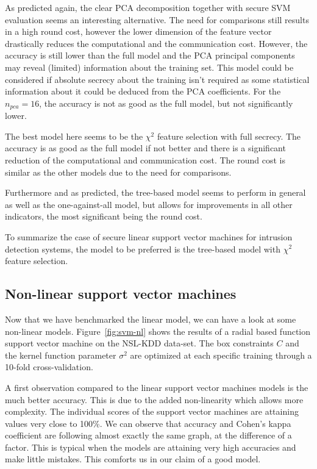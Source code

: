 As predicted again, the clear PCA decomposition together with secure SVM evaluation seems an interesting alternative. The need for comparisons still results in a high round cost, however the lower dimension of the feature vector drastically reduces the computational and the communication cost. However, the accuracy is still lower than the full model and the PCA principal components may reveal (limited) information about the training set. This model could be considered if absolute secrecy about the training isn't required as some statistical information about it could be deduced from the PCA coefficients. For the $n_{pca}=16$, the accuracy is not as good as the full model, but not significantly lower.

The best model here seems to be the $\chi^2$ feature selection with full secrecy. The accuracy is as good as the full model if not better and there is a significant reduction of the computational and communication cost. The round cost is similar as the other models due to the need for comparisons.

Furthermore and as predicted, the tree-based model seems to perform in general as well as the one-against-all model, but allows for improvements in all other indicators, the most significant being the round cost.

To summarize the case of secure linear support vector machines for intrusion detection systems, the model to be preferred is the tree-based model with $\chi^2$ feature selection.


\subsection{Non-linear support vector machines}
\label{sec:4-non-lin-svm}
Now that we have benchmarked the linear model, we can have a look at some non-linear models. Figure~\ref{fig:svm-nl} shows the results of a radial based function support vector machine on the NSL-KDD data-set. The box constraints $C$ and the kernel function parameter $\sigma^2$ are optimized at each specific training through a 10-fold cross-validation. 

A first observation compared to the linear support vector machines models is the much better accuracy. This is due to the added non-linearity which allows more complexity. The individual scores of the support vector machines are attaining values very close to 100\%. We can observe that accuracy and Cohen's kappa coefficient are following almost exactly the same graph, at the difference of a factor. This is typical when the models are attaining very high accuracies and make little mistakes. This comforts us in our claim of a good model.

